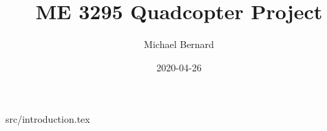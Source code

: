 \documentclass[12pt]{report}
\title{ME 3295 Quadcopter Project}
\author{Michael Bernard}
\date{2020-04-26}
\begin{document}
\maketitle

{src/introduction.tex}


\end{document}
